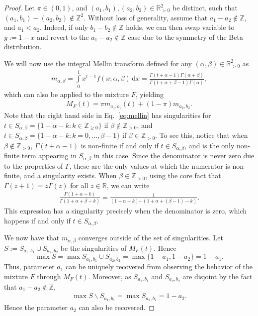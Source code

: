 \documentclass[lettersize,journal]{IEEEtran}
\newtheorem{proof}{Proof}
\begin{document}
\begin{proof}
Let $\pi \in (0,1)$, and $(a_1,b_1),(a_2,b_2)\in \mathbb{R}^2_{>0}$ be distinct, such that $(a_1,b_1)-(a_2,b_2) \notin \mathbb{Z}^2$. Without loss of generality, assume that $a_1-a_2 \notin \mathbb{Z}$, and $a_1<a_2$. Indeed, if only $b_1-b_2 \notin \mathbb{Z}$ holds, we can then swap variable to $y:=1-x$ and revert to the $a_1-a_2 \notin \mathbb{Z}$ case due to the symmetry of the Beta distribution.

We will now use the integral Mellin transform defined for any $(\alpha,\beta)\in \mathbb{R}^2_{>0}$ as
\begin{align}
    m_{\alpha,\beta} = \int\limits_0^1 x^{t-1} f(x;\alpha,\beta)\,\text{d}x = \frac{\Gamma(t+\alpha-1)\Gamma(\alpha+\beta)}{\Gamma(t+\alpha+\beta-1)\Gamma(\alpha)}, \label{eq:mellin}
\end{align}
which can also be applied to the mixture $F$, yielding
\begin{align*}
    M_F(t) = \pi m_{a_1,b_1}(t)+(1-\pi)m_{a_2,b_2}.
\end{align*}
Note that the right hand side in Eq.~\ref{eq:mellin} has singularities for $t \in S_{\alpha,\beta}= \{1-\alpha-k:k \in \mathbb{Z}_{\geq 0}\}$ if $\beta \notin \mathbb{Z}_{>0}$, and $t \in S_{\alpha,\beta}= \{1-\alpha-k:k=0,...,\beta-1\}$ if $\beta \in \mathbb{Z}_{>0}$. To see this, notice that when $\beta \notin \mathbb{Z}_{>0}$, $\Gamma(t+\alpha-1)$ is non-finite if and only if $t \in S_{\alpha,\beta}$, and is the only non-finite term appearing in $S_{\alpha,\beta}$ in this case. Since the denominator is never zero due to the properties of $\Gamma$, these are the only values at which the numerator is non-finite, and a singularity exists. When $\beta \in \mathbb{Z}_{>0}$, using the core fact that $\Gamma(z+1)=z\Gamma(z)$ for all $z \in \mathbb{R}$, we can write 
\begin{align*}
\frac{\Gamma(1+\alpha-k)}{\Gamma(1+\alpha+\beta-k)} = \frac{1}{(1+\alpha-k)\cdots(1+\alpha+(\beta-1)-k)}.
\end{align*}
This expression has a singularity precisely when the denominator is zero, which happens if and only if $t \in S_{\alpha,\beta}$.

We now have that $m_{\alpha,\beta}$ converges outside of the set of singularities. Let $S:=S_{a_1,b_1} \cup S_{a_2,b_2}$ be the singularities of $M_F(t)$. Hence
$$
    \max S = \max S_{a_1,b_1} \cup S_{a_2,b_2}
    = \max \{1-a_1,1-a_2\} = 1-a_1.
$$
Thus, parameter $a_1$ can be uniquely recovered from observing the behavior of the mixture $F$ through $M_F(t)$. Moreover, as $S_{a_1,b_1}$ and $S_{a_2,b_2}$ are disjoint by the fact that $a_1-a_2 \notin \mathbb{Z}$, 
\begin{align*}
    \max S\backslash S_{a_1,b_1} = \max S_{a_2,b_2} = 1-a_2.
\end{align*}
Hence the parameter $a_2$ can also be recovered.


\end{proof}
\end{document}
